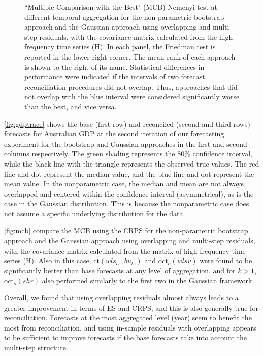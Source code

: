 \documentclass[a4paper,11pt]{article}
\theoremstyle{definition}
\begin{document}
\begin{figure}[p]
	\caption{“Multiple Comparison with the Best" (MCB) Nemenyi test at different temporal aggregation for the non-parametric bootstrap approach and the Gaussian approach using overlapping and multi-step residuals, with the covariance matrix calculated from the high frequency time series (H). In each panel, the Friedman test is reported in the lower right corner. The mean rank of each approach is shown to the right of its name. Statistical differences in performance were indicated if the intervals of two forecast reconciliation procedures did not overlap. Thus, approaches that did not overlap with the blue interval were considered significantly worse than the best, and vice versa.}
	\label{fig:mcb}
\end{figure}

\autoref{fig:gdptrace} shows the base (first row) and reconciled (second and third rows) forecasts for Australian GDP at the second iteration of our forecasting experiment for the bootstrap and Gaussian approaches in the first and second columns respectively. The green shading represents the 80\% confidence interval, while the black line with the triangle represents the observed true values. The red line and dot represent the median value, and the blue line and dot represent the mean value. In the nonparametric case, the median and mean are not always overlapped and centered within the confidence interval (asymmetrical), as is the case in the Gaussian distribution. This is because the nonparametric case does not assume a specific underlying distribution for the data.

\autoref{fig:mcb} compare the MCB using the CRPS for the non-parametric bootstrap approach and the Gaussian approach using overlapping and multi-step residuals, with the covariance matrix calculated from the matrix of high frequency time series (H). Also in this case, ct$(wls_{cs},bu_{te})$ and oct$_o(wlsv)$ were found to be significantly better than base forecasts at any level of aggregation, and for $k>1$, oct$_{o}(shr)$ also performed similarly to the first two in the Gaussian framework.

Overall, we found that using overlapping residuals almost always leads to a greater improvement in terms of ES and CRPS, and this is also generally true for reconciliation. Forecasts at the most aggregated level (year) seem to benefit the most from reconciliation, and using in-sample residuals with overlapping appears to be sufficient to improve forecasts if the base forecasts take into account the multi-step structure.
\end{document}
